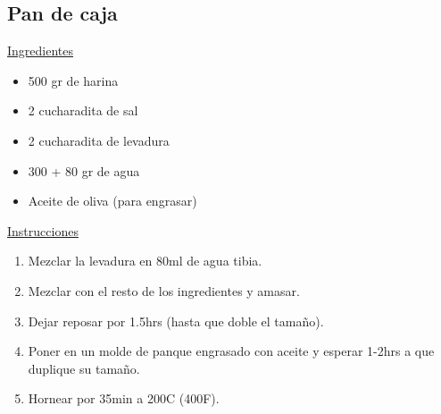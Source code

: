\subsection{Pan de caja}

\underline{Ingredientes}

\begin{itemize}
\item 500 gr de harina
\item 2 cucharadita de sal
\item 2 cucharadita de levadura
\item 300 + 80 gr de agua
\item Aceite de oliva (para engrasar)
\end{itemize}

\underline{Instrucciones}

\begin{enumerate}
\item Mezclar la levadura en 80ml de agua tibia.
\item Mezclar con el resto de los ingredientes y amasar.
\item Dejar reposar por \Sim1.5hrs (hasta que doble el tamaño).
\item Poner en un molde de panque engrasado con aceite y esperar 1-2hrs a que duplique su tamaño.
\item Hornear por \Sim35min a 200C (400F).
\end{enumerate}
